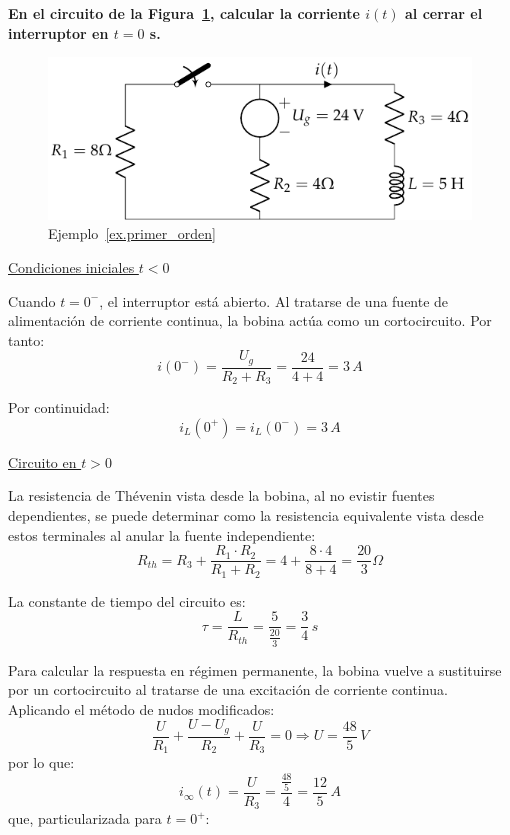 \begin{example}\label{ex.primer_orden}
  \textbf{En el circuito de la Figura~\ref{fig.ej_transitorio_1orden},
    calcular la corriente $i(t)$ al cerrar el interruptor en $t = 0$
    s.}
  \begin{figure}[H]
    \centering \includegraphics{../figs/ej_transitorio_1orden.pdf}
    \caption{Ejemplo~\ref{ex.primer_orden}}
    \label{fig.ej_transitorio_1orden}
  \end{figure}
	    
  \underline{Condiciones iniciales $t<0$}
	    
  Cuando $t=0^-$, el interruptor está abierto. Al tratarse de una
  fuente de alimentación de corriente continua, la bobina actúa como
  un cortocircuito. Por tanto:
  \begin{equation*}
    i(0^-)=\dfrac{U_g}{R_2+R_3}=\dfrac{24}{4+4}=3\,A
  \end{equation*}
	    
  Por continuidad:
  \begin{equation*}
    i_L(0^+)=i_L(0^-)=3\,A
  \end{equation*}
	    
  \underline{Circuito en $t>0$}
	    
  La resistencia de Thévenin vista desde la bobina, al no evistir
  fuentes dependientes, se puede determinar como la resistencia
  equivalente vista desde estos terminales al anular la fuente
  independiente:
  \begin{equation*}
    R_{th}=R_3+\dfrac{R_1\cdot R_2}{R_1+R_2}=4+\dfrac{8\cdot 4}{8+4}=\dfrac{20}{3}\Omega
  \end{equation*}
	    
  La constante de tiempo del circuito es:
  \begin{equation*}
    \tau=\dfrac{L}{R_{th}}=\dfrac{5}{\frac{20}{3}}=\dfrac{3}{4} \,s
  \end{equation*}
	    
  Para calcular la respuesta en régimen permanente, la bobina vuelve a
  sustituirse por un cortocircuito al tratarse de una excitación de
  corriente continua. Aplicando el método de nudos modificados:
  \begin{equation*}
    \dfrac{U}{R_1}+\dfrac{U-U_g}{R_2}+\dfrac{U}{R_3}=0\Rightarrow U=\dfrac{48}{5}\,V
  \end{equation*}
  por lo que:
  \begin{equation*}
    i_\infty(t)=\dfrac{U}{R_3}=\dfrac{\frac{48}{5}}{4}=\dfrac{12}{5}\,A
  \end{equation*}
  que, particularizada para $t=0^+$:
	    

\end{example}

